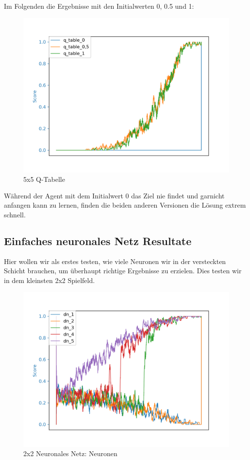 Im Folgenden die Ergebnisse mit den Initialwerten 0, 0.5 und 1:

\begin{figure}[H]
\centering
\includegraphics[width=\textwidth]{Figures/5x5_q_table_0_q_table_0,5_q_table_1.png}
\caption{5x5 Q-Tabelle}
\label{q2}
\end{figure}

Während der Agent mit dem Initialwert 0 das Ziel nie findet und garnicht anfangen kann zu lernen, finden die beiden anderen Versionen die Lösung extrem schnell.

\subsection{Einfaches neuronales Netz Resultate}
\label{subsec:dn_r}

Hier wollen wir als erstes testen, wie viele Neuronen wir in der versteckten Schicht brauchen, um überhaupt richtige Ergebnisse zu erzielen. Dies testen wir in dem kleinsten 2x2 Spielfeld.

\begin{figure}[H]
\centering
\includegraphics[width=\textwidth]{Figures/2x2_dn_1_dn_2_dn_3_dn_4_dn_5.png}
\caption{2x2 Neuronales Netz: Neuronen}
\label{dn1}
\end{figure}

